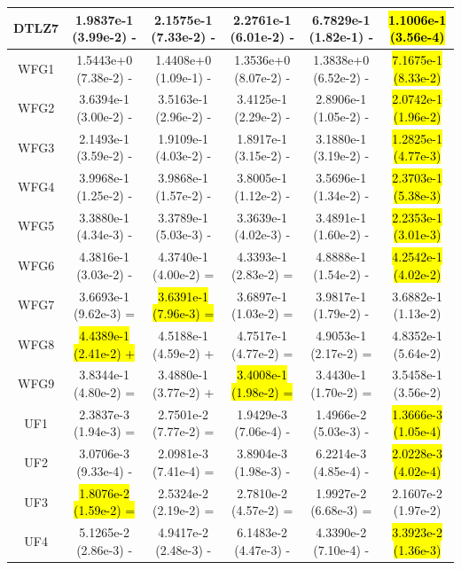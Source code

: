 \documentclass[journal]{IEEEtran}
\begin{document}
\begin{table}[tbp]
\begin{tabular}{cccccc}
    DTLZ7   & 1.9837e-1 (3.99e-2) -      & 2.1575e-1 (7.33e-2) -      & 2.2761e-1 (6.01e-2) -      & 6.7829e-1 (1.82e-1) -      & \hl{1.1006e-1 (3.56e-4)} \\
    \hline
    WFG1    & 1.5443e+0 (7.38e-2) -      & 1.4408e+0 (1.09e-1) -      & 1.3536e+0 (8.07e-2) -      & 1.3838e+0 (6.52e-2) -      & \hl{7.1675e-1 (8.33e-2)} \\
    WFG2    & 3.6394e-1 (3.00e-2) -      & 3.5163e-1 (2.96e-2) -      & 3.4125e-1 (2.29e-2) -      & 2.8906e-1 (1.05e-2) -      & \hl{2.0742e-1 (1.96e-2)} \\
    WFG3    & 2.1493e-1 (3.59e-2) -      & 1.9109e-1 (4.03e-2) -      & 1.8917e-1 (3.15e-2) -      & 3.1880e-1 (3.19e-2) -      & \hl{1.2825e-1 (4.77e-3)} \\
    WFG4    & 3.9968e-1 (1.25e-2) -      & 3.9868e-1 (1.57e-2) -      & 3.8005e-1 (1.12e-2) -      & 3.5696e-1 (1.34e-2) -      & \hl{2.3703e-1 (5.38e-3)} \\
    WFG5    & 3.3880e-1 (4.34e-3) -      & 3.3789e-1 (5.03e-3) -      & 3.3639e-1 (4.02e-3) -      & 3.4891e-1 (1.60e-2) -      & \hl{2.2353e-1 (3.01e-3)} \\
    WFG6    & 4.3816e-1 (3.03e-2) -      & 4.3740e-1 (4.00e-2) =      & 4.3393e-1 (2.83e-2) =      & 4.8888e-1 (1.54e-2) -      & \hl{4.2542e-1 (4.02e-2)} \\
    WFG7    & 3.6693e-1 (9.62e-3) =      & \hl{3.6391e-1 (7.96e-3) =} & 3.6897e-1 (1.03e-2) =      & 3.9817e-1 (1.79e-2) -      & 3.6882e-1 (1.13e-2)      \\
    WFG8    & \hl{4.4389e-1 (2.41e-2) +} & 4.5188e-1 (4.59e-2) +      & 4.7517e-1 (4.77e-2) =      & 4.9053e-1 (2.17e-2) =      & 4.8352e-1 (5.64e-2)      \\
    WFG9    & 3.8344e-1 (4.80e-2) =      & 3.4880e-1 (3.77e-2) +      & \hl{3.4008e-1 (1.98e-2) =} & 3.4430e-1 (1.70e-2) =      & 3.5458e-1 (3.56e-2)      \\
    \hline
    UF1     & 2.3837e-3 (1.94e-3) =      & 2.7501e-2 (7.77e-2) =      & 1.9429e-3 (7.06e-4) -      & 1.4966e-2 (5.03e-3) -      & \hl{1.3666e-3 (1.05e-4)} \\
    UF2     & 3.0706e-3 (9.33e-4) -      & 2.0981e-3 (7.41e-4) =      & 3.8904e-3 (1.98e-3) -      & 6.2214e-3 (4.85e-4) -      & \hl{2.0228e-3 (4.02e-4)} \\
    UF3     & \hl{1.8076e-2 (1.59e-2) =} & 2.5324e-2 (2.19e-2) =      & 2.7810e-2 (4.57e-2) =      & 1.9927e-2 (6.68e-3) =      & 2.1607e-2 (1.97e-2)      \\
    UF4     & 5.1265e-2 (2.86e-3) -      & 4.9417e-2 (2.48e-3) -      & 6.1483e-2 (4.47e-3) -      & 4.3390e-2 (7.10e-4) -      & \hl{3.3923e-2 (1.36e-3)} \\

\end{tabular}
\end{table}
\end{document}

